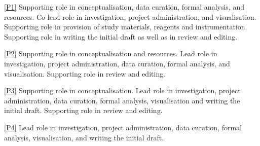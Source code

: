 \documentclass[draft,webedition,openright,titles,swedish,english]{LuaUUThesis}\usepackage[]{graphicx}\usepackage[]{xcolor}
\begin{document}
\begin{authorscontributions}
   \item[\cref{P1}]
   Supporting role in conceptualisation, data curation, formal analysis, and resources.
   Co-lead role in investigation, project administration, and visualisation.
   Supporting role in provision of study materials, reagents and instrumentation.
   Supporting role in writing the initial draft as well as in review and editing.
   \item[\cref{P2}]
   Supporting role in conceptualisation and resources.
   Lead role in investigation, project administration, data curation,
   formal analysis, and visualisation.
   Supporting role in review and editing.
   \item[\cref{P3}]
   Supporting role in conceptualisation.
   Lead role in investigation, project administration, data curation,
   formal analysis, visualisation and writing the initial draft.
   Supporting role in review and editing.
   \item[\cref{P4}]
   Lead role in investigation, project administration, data curation, formal analysis,
   visualisation, and writing the initial draft.
\end{authorscontributions}
\clearpage
%
\end{document}
